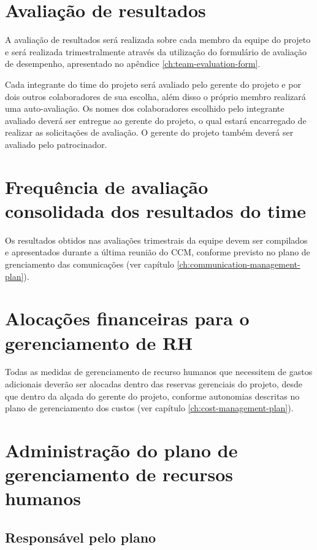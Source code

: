 \section{Avaliação de resultados}

A avaliação de resultados será realizada sobre cada membro da equipe do projeto e será realizada trimestralmente através da utilização do formulário de avaliação de desempenho, apresentado no apêndice \ref{ch:team-evaluation-form}.

Cada integrante do time do projeto será avaliado pelo gerente do projeto e por dois outros colaboradores de sua escolha, além disso o próprio membro realizará uma auto-avaliação. Os nomes dos colaboradores escolhido pelo integrante avaliado deverá ser entregue ao gerente do projeto, o qual estará encarregado de realizar as solicitações de avaliação. O gerente do projeto também deverá ser avaliado pelo patrocinador.

\section{Frequência de avaliação consolidada dos resultados do time}

Os resultados obtidos nas avaliações trimestrais da equipe devem ser compilados e apresentados durante a última reunião do CCM, conforme previsto no plano de grenciamento das comunicações (ver capítulo \ref{ch:communication-management-plan}).

\section{Alocações financeiras para o gerenciamento de RH}

Todas as medidas de gerenciamento de recurso humanos que necessitem de gastos adicionais deverão ser alocadas dentro das reservas gerenciais do projeto, desde que dentro da alçada do gerente do projeto, conforme autonomias descritas no plano de gerenciamento dos custos (ver capítulo \ref{ch:cost-management-plan}). 

\section{Administração do plano de gerenciamento de recursos humanos}

\subsection{Responsável pelo plano}

